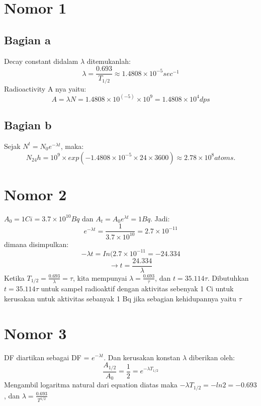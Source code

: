 \section{Nomor 1}
\subsection{Bagian a}
Decay constant didalam $\lambda$ ditemukanlah:
\begin{displaymath} 
\lambda = \frac {0.693}{T _{1/2}} \approx 1.4808 \times 10 ^{-5} sec ^{-1}
\end{displaymath}
Radioactivity A nya yaitu:
\begin{displaymath}
A = \lambda \textit{N} = 1.4808 \times 10 ^(-5) \times 10^9 = 1.4808 \times 10^4 dps
\end{displaymath}
\subsection{Bagian b}
Sejak $\textit{N}^t = \textit{N}_0e^{- \lambda t}$, maka:
\begin{displaymath}
\textit{N}_{24}h = 10^9 \times exp(-1.4808 \times 10^{-5} \times 24 \times 3600) \approx 2.78 \times 10^8 atoms.
\end{displaymath}

\section{Nomor 2}
$A_0 = 1 Ci = 3.7 \times 10^{10}Bq$ dan $A_\textit{t} = A_0e^{\lambda \textit{t}} = 1Bq$. Jadi:
\begin{displaymath}
e^{- \lambda \textit{t}} = \frac {1}{3.7 \times 10^{10}} = 2.7 \times 10^{-11}
\end{displaymath}
dimana disimpulkan:
\begin{displaymath}
- \lambda \textit{t} = In (2.7 \times 10^{-11} = -24.334
\end{displaymath}
\begin{displaymath}
\to t = \frac {24.334}{\lambda}
\end{displaymath}
Ketika $\textit{T}_{1/2} = \frac {0.693}{\lambda} = \tau$, kita mempunyai $\lambda = \frac {0.693}{\tau}$, dan $\textit{t} = 35.114 \tau$. Dibutuhkan $\textit{t} = 35.114 \tau$ untuk sampel radioaktif dengan aktivitas sebenyak 1 Ci untuk kerusakan untuk aktivitas sebanyak 1 Bq jika sebagian kehidupannya yaitu $\tau$

\section{Nomor 3}
DF diartikan sebagai DF = $e^{- \lambda \textit{t}}$. Dan kerusakan konstan $\lambda$ diberikan oleh:
\begin{displaymath}
\frac {A_{1/2}}{A_0} = \frac {1}{2} = e^{- \lambda \textit{T} _{1/2}}
\end{displaymath}
Mengambil logaritma natural dari equation diatas maka $- \lambda \textit{T}_{1/2}= -ln 2 = -0.693$, dan $\lambda = \frac {0.693}{\textit{T}^{1/2}}$